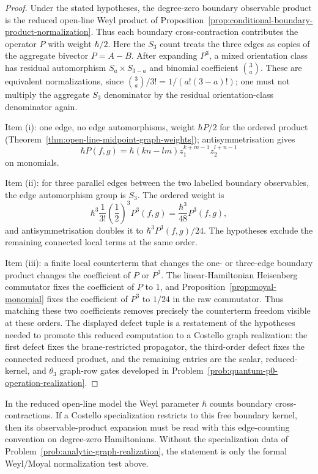 \documentclass[11pt]{memoir}
\begin{document}
\begin{proof}
  Under the stated hypotheses, the degree-zero boundary observable product is
  the reduced open-line Weyl product of
  Proposition~\ref{prop:conditional-boundary-product-normalization}. Thus each
  boundary cross-contraction contributes the operator $P$ with weight
  $\hbar/2$.
  Here the \(S_3\) count treats the three edges as copies of the aggregate
  bivector \(P=A-B\).  After expanding \(P^3\), a mixed orientation class
  has residual automorphism \(S_a\times S_{3-a}\) and binomial coefficient
  \(\binom{3}{a}\). These are equivalent normalizations, since
  \(\binom{3}{a}/3!=1/(a!(3-a)!)\); one must not multiply the aggregate
  \(S_3\) denominator by the residual orientation-class denominator again.

  Item (i): one edge, no edge automorphisms, weight $\hbar P/2$ for the
  ordered product (Theorem~\ref{thm:open-line-midpoint-graph-weights});
  antisymmetrisation gives
  $$\hbar P(f,g)=\hbar(kn-lm)z_1^{k+m-1}z_2^{l+n-1}$$
  on monomials.

  Item (ii): for three parallel edges between the two labelled boundary
  observables, the edge automorphism group is $S_3$. The ordered weight is
  $$\hbar^3\frac1{3!}\left(\frac12\right)^3P^3(f,g)
    =\frac{\hbar^3}{48}P^3(f,g),$$
  and antisymmetrisation doubles it to $\hbar^3P^3(f,g)/24$. The hypotheses
  exclude the remaining connected local terms at the same order.

  Item (iii): a finite local counterterm that changes the one- or three-edge
  boundary product changes the coefficient of $P$ or $P^3$. The
  linear-Hamiltonian Heisenberg commutator fixes the coefficient of $P$ to
  $1$, and Proposition~\ref{prop:moyal-monomial} fixes the coefficient of
  $P^3$ to $1/24$ in the raw commutator. Thus matching these two coefficients
  removes precisely the counterterm freedom visible at these orders.  The
  displayed defect tuple is a restatement of the hypotheses needed to promote
  this reduced computation to a Costello graph realization: the first defect fixes
  the brane-restricted propagator, the third-order defect fixes the
  connected reduced product, and the remaining entries are the scalar,
  reduced-kernel, and \(\theta_3\) graph-row gates developed in
  Problem~\ref{prob:quantum-p0-operation-realization}.
\end{proof}

\begin{rmk}
  In the reduced open-line model the Weyl parameter $\hbar$ counts boundary
  cross-contractions. If a Costello specialization restricts to this free
  boundary kernel, then its observable-product expansion must be read with this
  edge-counting convention on degree-zero Hamiltonians. Without the
  specialization data of Problem~\ref{prob:analytic-graph-realization}, the
  statement is only the formal Weyl/Moyal normalization test above.
\end{rmk}
\end{document}
